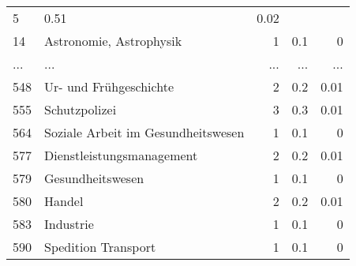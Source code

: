 \begin{longtable}{lXrrr}
          \num{5} &
          \num[round-mode=places,round-precision=2]{0.51} &
          \num[round-mode=places,round-precision=2]{0.02} \\
        14 & \multicolumn{1}{X}{Astronomie, Astrophysik} & %
          \num{1} &
          \num[round-mode=places,round-precision=2]{0.1} &
          \num[round-mode=places,round-precision=2]{0} \\
       ... & ... & ... & ... & ... \\
        548 & \multicolumn{1}{X}{Ur- und Frühgeschichte} & %
          \num{2} &
          \num[round-mode=places,round-precision=2]{0.2} &
          \num[round-mode=places,round-precision=2]{0.01} \\

        555 & \multicolumn{1}{X}{Schutzpolizei} & %
          \num{3} &
          \num[round-mode=places,round-precision=2]{0.3} &
          \num[round-mode=places,round-precision=2]{0.01} \\

        564 & \multicolumn{1}{X}{Soziale Arbeit im Gesundheitswesen} & %
          \num{1} &
          \num[round-mode=places,round-precision=2]{0.1} &
          \num[round-mode=places,round-precision=2]{0} \\

        577 & \multicolumn{1}{X}{Dienstleistungsmanagement} & %
          \num{2} &
          \num[round-mode=places,round-precision=2]{0.2} &
          \num[round-mode=places,round-precision=2]{0.01} \\

        579 & \multicolumn{1}{X}{Gesundheitswesen} & %
          \num{1} &
          \num[round-mode=places,round-precision=2]{0.1} &
          \num[round-mode=places,round-precision=2]{0} \\

        580 & \multicolumn{1}{X}{Handel} & %
          \num{2} &
          \num[round-mode=places,round-precision=2]{0.2} &
          \num[round-mode=places,round-precision=2]{0.01} \\

        583 & \multicolumn{1}{X}{Industrie} & %
          \num{1} &
          \num[round-mode=places,round-precision=2]{0.1} &
          \num[round-mode=places,round-precision=2]{0} \\

        590 & \multicolumn{1}{X}{Spedition Transport} & %
          \num{1} &
          \num[round-mode=places,round-precision=2]{0.1} &
          \num[round-mode=places,round-precision=2]{0} \\


\end{longtable}
